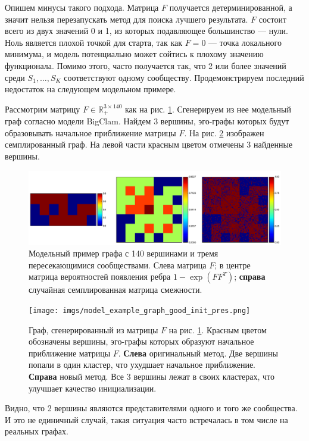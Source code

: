\documentclass{ITaSconf}
\def\RR{\mathbb{R}}
\begin{document}
	Опишем минусы такого подхода.
	Матрица $F$ получается детерминированной, а значит нельзя перезапускать метод для поиска лучшего результата.
	$F$ состоит всего из двух значений 0 и 1, из которых подавляющее большинство --- нули.
	Ноль является плохой точкой для старта, так как $F=0$ --- точка локального минимума, и модель потенциально может сойтись к плохому значению функционала.
	Помимо этого, часто получается так, что 2 или более значений среди $S_1, \dots, S_K$ соответствуют одному сообществу.
	Продемонстрируем последний недостаток на следующем модельном примере.
	
	Рассмотрим матрицу $F\in \RR_{+}^{3\times 140}$ как на рис. \ref{fig:model_ex}.
	Сгенерируем из нее модельный граф согласно модели BigClam.
	Найдем 3 вершины, эго-графы которых будут образовывать начальное приближение матрицы $F$.
	На рис. \ref{fig:model_ex_graph} изображен семплированный граф.
	На левой части красным цветом отмечены 3 найденные вершины.
	\begin{figure}[!ht]
		\centering
		\includegraphics[width=\linewidth]{imgs/model_example.png}
		\caption{Модельный пример графа с 140 вершинами и тремя пересекающимися сообществами.
	Слева матрица $F$; в центре матрица вероятностей появления ребра $1-\exp(FF^T)$; \textbf{справа} случайная семплированная матрица смежности.}
		\label{fig:model_ex}
	\end{figure}
	\begin{figure}[!ht]
		\centering
		\texttt{[image: imgs/model\_example\_graph\_good\_init\_pres.png]}
		\caption{Граф, сгенерированный из матрицы $F$ на рис. \ref{fig:model_ex}.
	Красным цветом обозначены вершины, эго-графы которых образуют начальное приближение матрицы $F$.
	\textbf{Слева} оригинальный метод.
	Две вершины попали в один кластер, что ухудшает начальное приближение.
	\textbf{Справа} новый метод.
	Все 3 вершины лежат в своих кластерах, что улучшает качество инициализации.}
		\label{fig:model_ex_graph}
	\end{figure}
	Видно, что 2 вершины являются представителями одного и того же сообщества.
	И это не единичный случай, такая ситуация часто встречалась в том числе на реальных графах.
	
\end{document}
